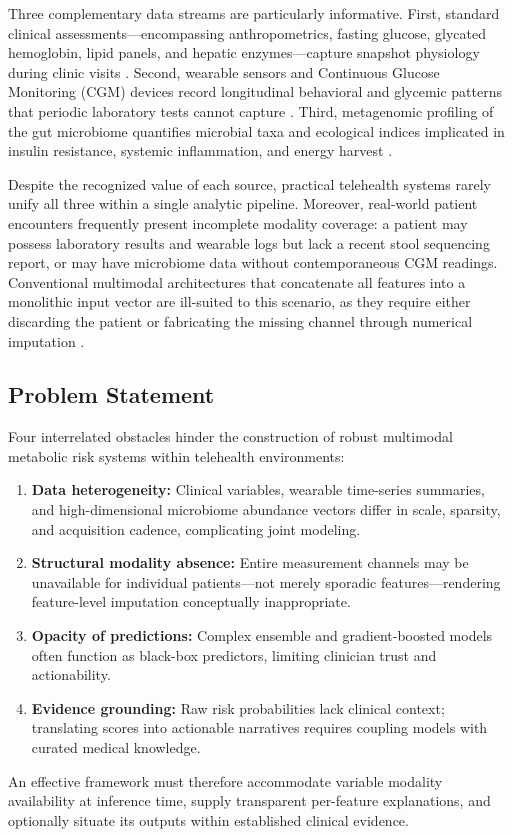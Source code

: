 \documentclass[10pt,twocolumn,letterpaper]{article}
\begin{document}
Three complementary data streams are particularly informative. First, standard clinical assessments---encompassing anthropometrics, fasting glucose, glycated hemoglobin, lipid panels, and hepatic enzymes---capture snapshot physiology during clinic visits \citep{rajkomar2018scalable}. Second, wearable sensors and Continuous Glucose Monitoring (CGM) devices record longitudinal behavioral and glycemic patterns that periodic laboratory tests cannot capture \citep{hall2018glucotypes, dunn2021wearable, battelino2019clinical}. Third, metagenomic profiling of the gut microbiome quantifies microbial taxa and ecological indices implicated in insulin resistance, systemic inflammation, and energy harvest \citep{qin2012metagenome, turnbaugh2006obesity, cani2019supplementation, aron2020gut}.

Despite the recognized value of each source, practical telehealth systems rarely unify all three within a single analytic pipeline. Moreover, real-world patient encounters frequently present incomplete modality coverage: a patient may possess laboratory results and wearable logs but lack a recent stool sequencing report, or may have microbiome data without contemporaneous CGM readings. Conventional multimodal architectures that concatenate all features into a monolithic input vector are ill-suited to this scenario, as they require either discarding the patient or fabricating the missing channel through numerical imputation \citep{rubin1976inference, vanbuuren2011mice, ma2021smil}.

\subsection{Problem Statement}
Four interrelated obstacles hinder the construction of robust multimodal metabolic risk systems within telehealth environments:
\begin{enumerate}
    \item \textbf{Data heterogeneity:} Clinical variables, wearable time-series summaries, and high-dimensional microbiome abundance vectors differ in scale, sparsity, and acquisition cadence, complicating joint modeling.
    \item \textbf{Structural modality absence:} Entire measurement channels may be unavailable for individual patients---not merely sporadic features---rendering feature-level imputation conceptually inappropriate.
    \item \textbf{Opacity of predictions:} Complex ensemble and gradient-boosted models often function as black-box predictors, limiting clinician trust and actionability.
    \item \textbf{Evidence grounding:} Raw risk probabilities lack clinical context; translating scores into actionable narratives requires coupling models with curated medical knowledge.
\end{enumerate}
An effective framework must therefore accommodate variable modality availability at inference time, supply transparent per-feature explanations, and optionally situate its outputs within established clinical evidence.
\end{document}
